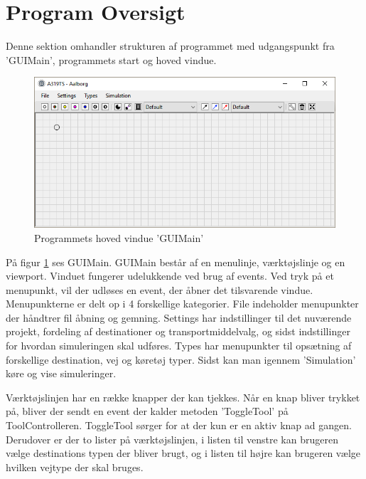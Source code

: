 \section{Program Oversigt}
Denne sektion omhandler strukturen af programmet med udgangspunkt fra 'GUIMain', programmets start og hoved vindue. 

\begin{figure}[!h]
    \centering
    \includegraphics[width=\textwidth,height=\textheight,keepaspectratio]{Pictures/Implementation/program}
    \caption{Programmets hoved vindue 'GUIMain'}
    \label{a319program}
\end{figure}

På figur \ref{a319program} ses GUIMain. GUIMain består af en menulinje, værktøjslinje og en viewport. Vinduet fungerer udelukkende ved brug af events. Ved tryk på et menupunkt, vil der udløses en event, der åbner det tilsvarende vindue. Menupunkterne er delt op i 4 forskellige kategorier. File indeholder menupunkter der håndtrer fil åbning og gemning. Settings har indstillinger til det nuværende projekt, fordeling af destinationer og transportmiddelvalg, og sidst indstillinger for hvordan simuleringen skal udføres. Types har menupunkter til opsætning af forskellige destination, vej og køretøj typer. Sidst kan man igennem 'Simulation' køre og vise simuleringer.

\vspace{5mm}

Værktøjslinjen har en række knapper der kan tjekkes. Når en knap bliver trykket på, bliver der sendt en event der kalder metoden 'ToggleTool' på ToolControlleren. ToggleTool sørger for at der kun er en aktiv knap ad gangen. Derudover er der to lister på værktøjslinjen, i listen til venstre kan brugeren vælge destinations typen der bliver brugt, og i listen til højre kan brugeren vælge hvilken vejtype der skal bruges.

